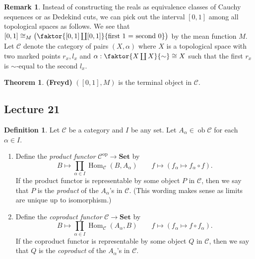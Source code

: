 \documentclass[10pt,letterpaper,cm]{nupset}
\theoremstyle{definition}
\newtheorem*{definition}{Definition}
\newtheorem{remark}{Remark}
\newtheorem{theorem}{Theorem}
\newcommand{\1}{\mathbf{1}}
\renewcommand{\c}{\mathscr{C}}
\newcommand{\0}{\vec 0}
\DeclareMathOperator{\op}{op}
\DeclareMathOperator{\ob}{ob}
\DeclareMathOperator{\Hom}{Hom}
\begin{document}
\begin{remark}
 Instead of constructing the reals as equivalence classes of Cauchy sequences or as Dedekind cuts, we can pick out the interval $[0,1]$ among all topological spaces as follows. We see that $[0,1]\cong_M \big ( \faktor{[0,1] \coprod [0,1]}{\text{first 1 = second 0}} \big )$ by the mean function $M$. Let $\c$ denote the category of pairs $(X, \alpha)$ where $X$ is a topological space with two marked points $r_x, l_x$ and $\alpha :  \faktor{X \coprod X}{\sim} \cong X$ such that the first $r_x$ is $\sim$-equal to the second $l_x$.
\begin{theorem}{\textbf{(Freyd)}}
$([0,1], M)$ is the terminal object in $\c$.
\end{theorem}
\end{remark}

\subsection{Lecture 21}

\begin{definition} Let $\c$ be a category and $I$ be any set. Let $A_{\alpha} \in \ob \c$ for each $\alpha \in I$.
\begin{enumerate}
\item  Define the \textit{product functor} $\c^{\op} \to \mathbf{Set}$ by $$B \mapsto \prod_{\alpha \in I}\Hom_{\c}(B, A_{\alpha}) \quad \quad f \mapsto (f_{\alpha} \mapsto f_{\alpha} \circ f).$$ If the product functor is representable by some object $P$ in $\c$, then we say that $P$ is the \textit{product} of the $A_{\alpha}$'s in $\c$. (This wording makes sense as limits are unique up to isomorphism.)
\item Define the \textit{coproduct functor} $\c \to \mathbf{Set}$ by $$ B \mapsto \prod_{\alpha \in I} \Hom_{\c}(A_{\alpha}, B) \quad \quad f \mapsto (f_{\alpha} \mapsto f \circ f_{\alpha}).$$ If the coproduct functor is representable by some object $Q$ in $\c$, then we say that $Q$ is the \textit{coproduct} of the $A_{\alpha}$'s in $\c$.
\end{enumerate}
\end{definition}
\end{document}
